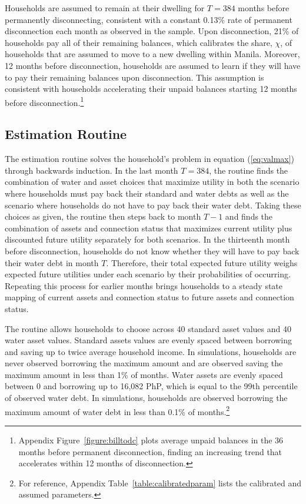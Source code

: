 \documentclass[12pt]{article}
\begin{document}
Households are assumed to remain at their dwelling for $T=384$ months before permanently disconnecting, consistent with a constant 0.13\% rate of permanent disconnection each month as observed in the sample.  Upon disconnection, 21\unskip\% of households pay all of their remaining balances, which calibrates the share, $\chi$, of households that are assumed to move to a new dwelling within Manila.  Moreover, 12 months before disconnection, households are assumed to learn if they will have to pay their remaining balances upon disconnection.  This assumption is consistent with households accelerating their unpaid balances starting 12 months before disconnection.\footnote{Appendix Figure~\ref{figure:billtodc} plots average unpaid balances in the 36 months before permanent disconnection, finding an increasing trend that accelerates within 12 months of disconnection.}

\subsection{Estimation Routine}\label{section:estimationroutine}

The estimation routine solves the household's problem in equation (\ref{eq:valmax}) through backwards induction.  In the last month $T=384$, the routine finds the combination of water and asset choices that maximize utility in both the scenario where households must pay back their standard and water debts as well as the scenario where households do not have to pay back their water debt.  Taking these choices as given, the routine then steps back to month $T-1$ and finds the combination of assets and connection status that maximizes current utility plus discounted future utility separately for both scenarios.  In the thirteenth month before disconnection, households do not know whether they will have to pay back their water debt in month $T$.  Therefore, their total expected future utility weighs expected future utilities under each scenario by their probabilities of occurring.  Repeating this process for earlier months brings households to a steady state mapping of current assets and connection status to future assets and connection status. 

The routine allows households to choose across 40 standard asset values and 40 water asset values.  Standard assets values are evenly spaced between borrowing and saving up to twice average household income.  In simulations, households are never observed borrowing the maximum amount and are observed saving the maximum amount in less than 1\% of months.  Water assets are evenly spaced between 0 and borrowing up to 16,082 PhP, which is equal to the 99th percentile of observed water debt.  In simulations, households are observed borrowing the maximum amount of water debt in less than 0.1\% of months.\footnote{For reference, Appendix Table~\ref{table:calibratedparam} lists the calibrated and assumed parameters.}
\end{document}
